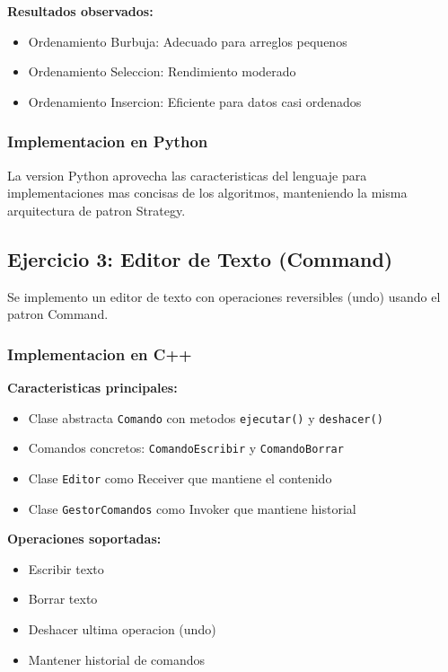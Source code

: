 \documentclass[11pt,a4paper]{article}
\begin{document}
\textbf{Resultados observados:}
\begin{itemize}
    \item Ordenamiento Burbuja: Adecuado para arreglos pequenos
    \item Ordenamiento Seleccion: Rendimiento moderado
    \item Ordenamiento Insercion: Eficiente para datos casi ordenados
\end{itemize}

\subsubsection{Implementacion en Python}

La version Python aprovecha las caracteristicas del lenguaje para implementaciones mas concisas de los algoritmos, manteniendo la misma arquitectura de patron Strategy.

\subsection{Ejercicio 3: Editor de Texto (Command)}

Se implemento un editor de texto con operaciones reversibles (undo) usando el patron Command.

\subsubsection{Implementacion en C++}

\textbf{Caracteristicas principales:}
\begin{itemize}
    \item Clase abstracta \texttt{Comando} con metodos \texttt{ejecutar()} y \texttt{deshacer()}
    \item Comandos concretos: \texttt{ComandoEscribir} y \texttt{ComandoBorrar}
    \item Clase \texttt{Editor} como Receiver que mantiene el contenido
    \item Clase \texttt{GestorComandos} como Invoker que mantiene historial
\end{itemize}

\textbf{Operaciones soportadas:}
\begin{itemize}
    \item Escribir texto
    \item Borrar texto
    \item Deshacer ultima operacion (undo)
    \item Mantener historial de comandos
\end{itemize}
\end{document}
